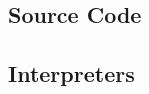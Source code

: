\begin{appendices}
\lstset{style=appendix}
\makeatletter
{}
\makeatother
  \chapter{Source Code}
  \section{Interpreters}
  \label{app:interpreters}
  

  
  

\end{appendices}





